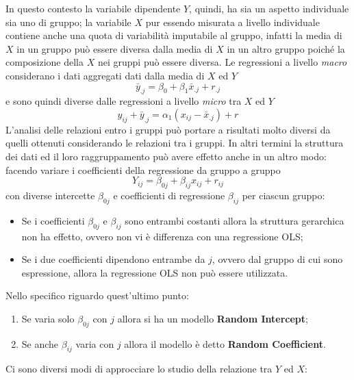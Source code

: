 \documentclass[a4page, 11pt]{article} %
\begin{document}
In questo contesto la variabile dipendente $Y$, quindi, ha sia un aspetto individuale sia uno di gruppo; la variabile $X$ pur essendo misurata a livello individuale contiene anche una quota di variabilità imputabile al gruppo, infatti la media di $X$ in un gruppo può essere diversa dalla media di $X$ in un altro gruppo poiché la composizione della $X$ nei gruppi può essere diversa.
\newline
Le regressioni a livello \textit{macro} considerano i dati aggregati dati dalla media di $X$ ed $Y$ $$\bar{y}_{.j} = \beta_0 + \beta_1\bar{x}_{.j}+ r_{.j}$$ e sono quindi diverse dalle regressioni a livello \textit{micro} tra $X$ ed $Y$ $$y_{ij} + \bar{y}_{.j} = \alpha_1 (x_{ij} - \bar{x}_{.j})+r$$
L’analisi delle relazioni entro i gruppi può portare a risultati molto diversi da quelli ottenuti considerando le relazioni tra i gruppi. In altri termini la struttura dei dati ed il loro raggruppamento può avere effetto anche in un altro modo: facendo variare i coefficienti della regressione da gruppo a gruppo
\begin{equation*}
Y_{ij} = \beta_{0j} + \beta_{ij} x_{ij} + r_{ij}
\end{equation*}
con diverse intercette $\beta_{0j}$ e coefficienti di regressione $\beta_{ij}$ per ciascun gruppo:
\begin{itemize}	
\item Se i coefficienti $\beta_{0j}$ e $\beta_{ij}$ sono entrambi costanti allora la struttura
gerarchica non ha effetto, ovvero non vi è differenza con una regressione OLS;
\item Se i due coefficienti dipendono entrambe da $j$, ovvero dal gruppo di cui sono espressione, allora la regressione OLS
non può essere utilizzata.
\end{itemize}
Nello specifico riguardo quest'ultimo punto:
	\begin{enumerate}
	\item Se varia solo $\beta_{0j}$ con $j$ allora si ha un modello \textbf{Random Intercept};
 	\item Se anche $\beta_{ij}$ varia con $j$ allora il modello è detto \textbf{Random Coefficient}.
	\end{enumerate}
Ci sono diversi modi di approcciare lo studio della relazione tra $Y$ ed $X$:
\end{document}
